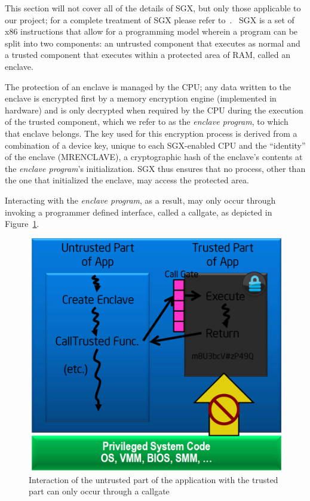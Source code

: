 \documentclass[../main.tex]{subfiles}
\begin{document}
This section will not cover all of the details of SGX, but only those
applicable to our project; for a complete treatment of SGX please
refer to~\cite{IntelCorporation2010}. \Intel~SGX is a set of x86
instructions that allow for a programming model wherein a program can
be split into two components: an untrusted component that executes as
normal and a trusted component that executes within a protected area
of RAM, called an enclave. 

The protection of an enclave is managed by the CPU; any data written
to the enclave is encrypted first by a memory encryption engine
(implemented in hardware) and is only decrypted when required by the
CPU during the execution of the trusted component, which we refer to
as the \textit{enclave program}, to which that enclave belongs. The
key used for this encryption process is derived from a combination of
a device key, unique to each SGX-enabled CPU and the ``identity'' of
the enclave (MRENCLAVE), a cryptographic hash of the enclave's
contents at the \textit{enclave program}'s initialization. SGX thus
ensures that no process, other than the one that initialized the
enclave, may access the protected area.

Interacting with the \textit{enclave program}, as a result, may only occur
through invoking a programmer defined interface, called a callgate, as
depicted in Figure~\ref{fig:sgxhighlevel}.

\begin{figure}[H]
  \centering
  \includegraphics[scale=0.25]{images/sgxhighlevel.png}
  \caption{Interaction of the untrusted part of the application with
    the trusted part can only occur through a callgate}
  \label{fig:sgxhighlevel}
\end{figure}
\end{document}
